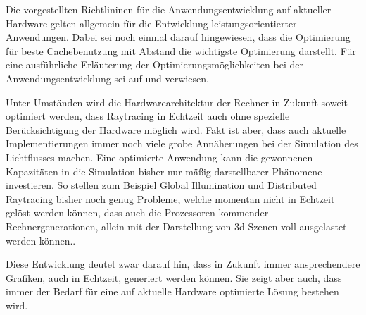 Die vorgestellten Richtlininen für die Anwendungsentwicklung auf aktueller Hardware gelten allgemein für die Entwicklung leistungsorientierter Anwendungen. Dabei sei noch einmal darauf hingewiesen, dass die Optimierung für beste Cachebenutzung mit Abstand die wichtigste Optimierung darstellt. Für eine ausführliche Erläuterung der Optimierungsmöglichkeiten bei der Anwendungsentwicklung sei auf \cite{Drepper07} und \cite{Fog08} verwiesen.

Unter Umständen wird die Hardwarearchitektur der Rechner in Zukunft soweit optimiert werden, dass Raytracing in Echtzeit auch ohne spezielle Berücksichtigung der Hardware möglich wird. Fakt ist aber, dass auch aktuelle Implementierungen immer noch viele grobe Annäherungen bei der Simulation des Lichtflusses machen. Eine optimierte Anwendung kann die gewonnenen Kapazitäten in die Simulation bisher nur mäßig darstellbarer Phänomene investieren. So stellen zum Beispiel Global Illumination und Distributed Raytracing bisher noch genug Probleme, welche momentan nicht in Echtzeit gelöst werden können, dass auch die Prozessoren kommender Rechnergenerationen, allein mit der Darstellung von 3d-Szenen voll ausgelastet werden können..

Diese Entwicklung deutet zwar darauf hin, dass in Zukunft immer ansprechendere Grafiken, auch in Echtzeit, generiert werden können. Sie zeigt aber auch, dass immer der Bedarf für eine auf aktuelle Hardware optimierte Lösung bestehen wird.